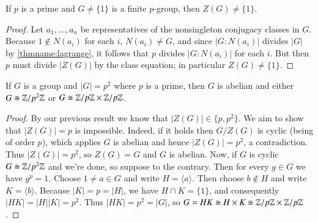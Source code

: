 \documentclass[12pt, a4paper, oneside, openright, titlepage]{book}
\begin{document}
\begin{thm}
    If $p$ is a prime and $G\neq \{1\}$ is a finite $p$-group, then $Z(G) \neq \{1\}$.
\end{thm}
\begin{proof}
    Let $a_1,...,a_n$ be representatives of the nonsingleton conjugacy classes in $G$. Because $1 \notin N(a_i)$ for each $i$, $N(a_i) \neq G$, and since $|G:N(a_i)|$ divides $|G|$ by \ref{thmname:lagrange}, it follows that $p$ divides $|G:N(a_i)|$ for each $i$. But then $p$ must divide $|Z(G)|$ by the class equation; in particular $Z(G) \neq \{1\}$.
\end{proof}

\begin{thm}
    If $G$ is a group and $|G| = p^2$ where $p$ is a prime, then $G$ is abelian and either $G\cong \mathbb Z/p^2\mathbb Z$ or $G\cong \mathbb Z/p\mathbb Z\times \mathbb Z/p\mathbb Z$.
\end{thm}
\begin{proof}
    By our previous result we know that $|Z(G)| \in \{p,p^2\}$. We aim to show that $|Z(G)| = p$ is impossible. Indeed, if it holds then $G/Z(G)$ is cyclic (being of order $p$), which applies $G$ is abelian and hence $|Z(G)| = p^2$, a contradiction. Thus $|Z(G)| = p^2$, so $Z(G) = G$ and $G$ is abelian. Now, if $G$ is cyclic $G \cong \mathbb Z/p^2\mathbb Z$ and we're done, so suppose to the contrary. Then for every $g \in G$ we have $g^p = 1$. Choose $1 \neq a \in G$ and write $H = \langle a \rangle$. Then choose $b \notin H$ and write $K = \langle b \rangle$. Because $|K| = p = |H|$, we have $H\cap K = \{1\}$, and consequently $|HK| = |H||K| = p^2$. Thus $|HK| = p^2 = |G|$, so $G = HK \cong H\times K\cong \mathbb Z/p\mathbb Z\times\mathbb Z/p\mathbb Z$.
\end{proof}
\end{document}
